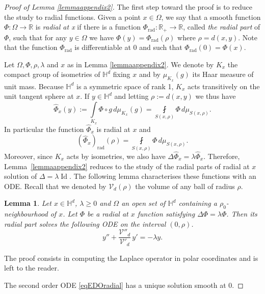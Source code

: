 \documentclass[JEP,XML,SOM,Unicode,NoFloatCountersInSection,published]{cedram}
\let\mathcal\mathscr
\theoremstyle{plain}
\newtheorem{lemma}[equation]{Lemma}
\theoremstyle{definition}
\newcommand{\HH}{\mathbb{H}}
\newcommand{\RR}{\mathbb{R}}
\newcommand{\inte}[1]{\underset{#1}{\int}}
\newcommand{\finte}[3]{\underset{#1}{\fint} {#2} \, {#3}}
\DeclareMathOperator{\Id}{Id}
\begin{document}
\begin{proof}[Proof of Lemma \ref{lemmaappendix2}]
The first step toward the proof is to reduce the study to radial functions. Given a point $x \in \Omega$, we say that a smooth function $\Phi : \Omega \to \RR$ is \emph{radial at x} if there is a function $\Phi_{\mathrm{rad}} : \RR_+ \to \RR$, called \emph{the radial part} of $\Phi$, such that for any $y \in \Omega$ we have $\Phi(y) = \Phi_{\mathrm{rad}}(\rho)$ where $\rho = d(x,y)$. Note that the function $\Phi_{\mathrm{rad}}$ is differentiable at $0$ and such that $ \Phi_{\mathrm{rad}}(0) = \Phi(x)$.

Let $\Omega, \Phi, \rho, \lambda$ and $x$ as in Lemma \ref{lemmaappendix2}. We denote by $K_x$ the compact group of isometries of $\HH^d$ fixing $x$ and by $\mu_{K_x}(g)$ its Haar measure of unit mass. Because $\HH^d$ is a symmetric space of rank 1, $K_x$ acts transitively on the unit tangent sphere at $x$. If $y \in \HH^d$ and letting $\rho := d(x,y)$ we thus have
\[
\widehat{\Phi}_x(y) := \inte{K_x} \Phi \circ g \,d \mu_{K_x}(g) = \finte{S(x, \rho)}{\Phi}{ d \mu_{S(x,\rho)}}.
\]
In particular the function $\widehat{\Phi}_x$ is radial at $x$ and
\[
(\widehat{\Phi}_{x})_{\mathrm{rad}} (\rho) = \finte{S(x, \rho)}{\Phi}{ d \mu_{S(x,\rho)}}.
\]
Moreover, since $K_x$ acts by isometries, we also have $\Delta \widehat{\Phi}_x = \lambda \widehat{\Phi}_x$. Therefore, Lem\-ma~\ref{lemmaappendix2} reduces to the study of the radial parts of radial at $x$ solution of $\Delta = \lambda \Id$. The following lemma characterises these functions with an ODE. Recall that we denoted by $\mathcal{V}_d(\rho)$ the volume of any ball of radius $\rho$.

\begin{lemma}
\label{lemappendix1}
Let $x \in \HH^d$, $\lambda \ge 0$ and $\Omega$ an open set of $\HH^d$ containing a $\rho_0$\nobreakdash-neigh\-bourhood of $x$. Let $\Phi$ be a radial at $x$ function satisfying $\Delta \Phi = \lambda \Phi$. Then its radial part solves the following ODE on the interval $(0,\rho)$.
\begin{equation}
\label{eqEDOradial}
y'' + \frac{\mathcal{V}''_d}{\mathcal{V}'_d} \, y' = - \lambda y.
\end{equation}
\end{lemma}

The proof consists in computing the Laplace operator in polar coordinates and is left to the reader.

The second order ODE \eqref{eqEDOradial} has a unique solution smooth at $0$.


\end{proof}
\end{document}
